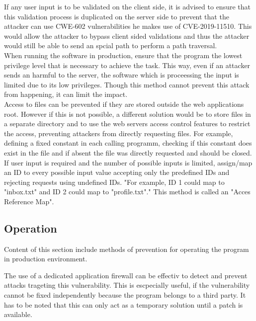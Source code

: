 If any user input is to be validated on the client side, it is advised to ensure that this validation process is duplicated on the server side to prevent that the attacker can use CWE-602 vulnerabilities he makes use of CVE-2019-11510. This would allow the attacker to bypass client sided validations and thus the attacker would still be able to send an spcial path to perform a path traversal. \autocite{CWE22-Definition:online}\\
When running the software in production, ensure that the program the lowest privilege level that is necessary to achieve the task. This way, even if an attacker sends an harmful to the server, the software which is proceessing the input is limited due to its low privileges. Though this method cannot prevent this attack from happening, it can limit the impact.\autocite{CWE22-Definition:online}\\
Access to files can be prevented if they are stored outside the web applications root. However if this is not possible, a different solution would be to store files in a separate directory and to use the web servers access control features to restrict the access, preventing attackers from directly requesting files. For example, defining a fixed constant in each calling programm, checking if this constant does exist in the file and if absent the file was directly requested and should be closed. \autocite{CWE22-Definition:online}\\
If user input is required and the number of possible inputs is limited, assign/map an ID to every possible input value accepting only the predefined IDs and rejecting requests using undefined IDs. \autocite{CWE22-Definition:online} "For example, ID 1 could map to "inbox.txt" and ID 2 could map to "profile.txt"." \autocite{CWE22-Definition:online} This method is called an "Acces Reference Map".

\subsection{Operation}
\label{operation}
Content of this section include methods of prevention for operating the program in production environment.

The use of a dedicated application firewall can be effectiv to detect and prevent attacks trageting this vulnerability. This is escpecially useful, if the vulnerability cannot be fixed independently because the program belongs to a third party. \autocite{CWE22-Definition:online} It has to be noted that this can only act as a temporary solution until a patch is available.

